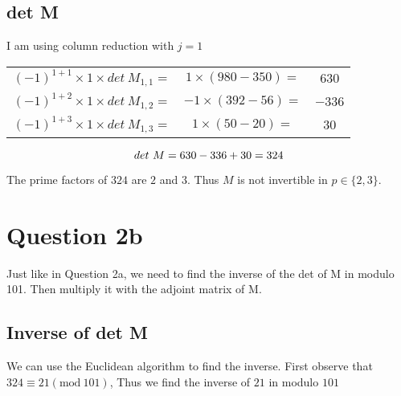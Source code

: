\documentclass{article}
\numberwithin{equation}{subsection}
\begin{document}
	\subsection*{det M}
	\begin{adjustwidth}{2em}{2em}
		
	\par{
		I am using column reduction with $j=1$
	}
	
	\begin{tabular}{c c c}
		$(-1)^{1+1} \times 1 \times det \ M_{1,1} = $ & $1 \times (980-350) = $ & $630$ \\  
		$(-1)^{1+2} \times 1 \times det \ M_{1,2} = $ & $-1 \times (392-56) = $ & $-336$ \\  
		$(-1)^{1+3} \times 1 \times det \ M_{1,3} = $ & $1 \times (50-20) = $ & $30$ \\  
	\end{tabular}

	\begin{equation}\notag
		det \ M = 630 - 336 + 30 = 324	
	\end{equation}

	\end{adjustwidth}
	\par{
		The prime factors of $324$ are $2$ and $3$. Thus $M$ is not invertible in $p \in \{2,3\}$.
	}

	\vspace{30pt}
	\section*{Question 2b}
	\par{
		Just like in Question 2a, we need to find the inverse of the det of M in modulo 101. Then
		multiply it with the adjoint matrix of M.
	}

	\subsection*{Inverse of det M}
	\begin{adjustwidth}{2em}{2em}
		\par{
			We can use the Euclidean algorithm to find the inverse. First observe that 
			$324 \equiv 21 (\textrm{mod}\ 101)$, Thus we find the inverse of $21$ in modulo $101$
		}
	\end{adjustwidth}
	
	\newpage
	\thispagestyle{fancy}
\end{document}
